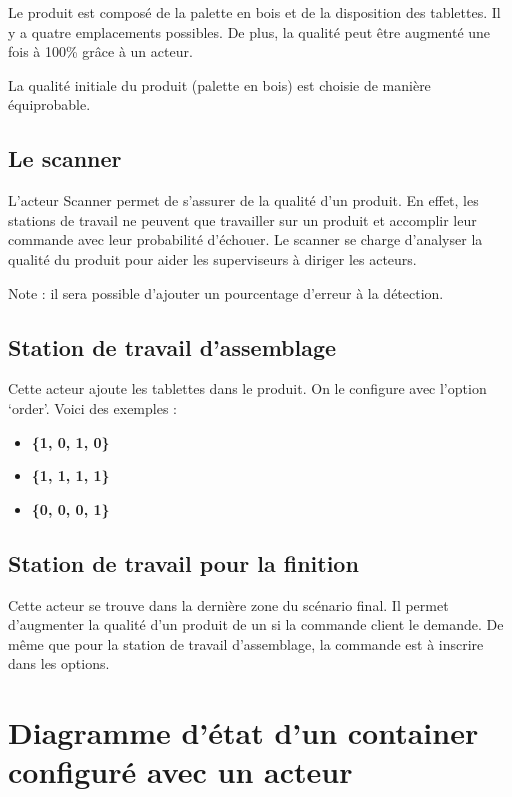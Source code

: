 \documentclass[12pt,a4paper]{article}
\begin{document}
			 Le produit est composé de la palette en bois et de la disposition
			 des tablettes. Il y a quatre emplacements possibles. De plus,
			 la qualité peut être augmenté une fois à 100\% gr\^ace à un acteur.

			 La qualité initiale du produit (palette en bois) est choisie de
			 manière équiprobable.

		\subsection{Le scanner}
			L'acteur Scanner permet de s'assurer de la qualité d'un produit.
			En effet, les stations de travail ne peuvent que travailler sur un
			produit et accomplir leur commande avec leur probabilité d'échouer.
			Le scanner se charge d'analyser la qualité du produit pour aider
			les superviseurs à diriger les acteurs.

			Note : il sera possible d'ajouter un pourcentage d'erreur à la 
			détection.

		\subsection{Station de travail d'assemblage}
			Cette acteur ajoute les tablettes dans le produit. On le configure
			avec l'option `order'. Voici des exemples :

			\begin{itemize}
				\item \textbf{\{1, 0, 1, 0\}}
				\item \textbf{\{1, 1, 1, 1\}}
				\item \textbf{\{0, 0, 0, 1\}}
			\end{itemize}

		\subsection{Station de travail pour la finition}
			Cette acteur se trouve dans la dernière zone du scénario final. Il
			permet d'augmenter la qualité d'un produit de un si la commande
			client le demande. De même que pour la station de travail 
			d'assemblage, la commande est à inscrire dans les options.

	\section{Diagramme d'état d'un container configuré avec un acteur}
\end{document}
